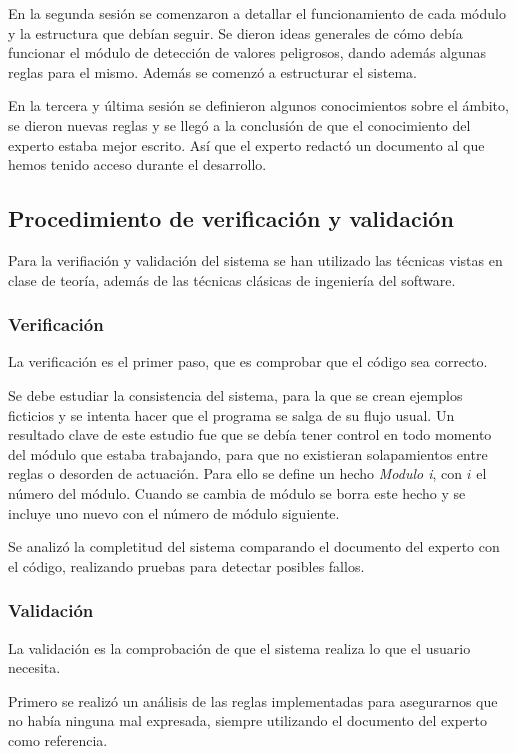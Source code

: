 \documentclass[a4paper, 11pt, titlepage]{article}
\theoremstyle{definition}
\begin{document}
  En la segunda sesión se comenzaron a detallar el funcionamiento de cada módulo
  y la estructura que debían seguir. Se dieron ideas generales de cómo debía
  funcionar el módulo de detección de valores peligrosos, dando además algunas
  reglas para el mismo. Además se comenzó a estructurar el sistema.

  En la tercera y última sesión se definieron algunos conocimientos sobre el
  ámbito, se dieron nuevas reglas y se llegó a la conclusión de que el conocimiento
  del experto estaba mejor escrito. Así que el experto redactó un documento
  al que hemos tenido acceso durante el desarrollo.

  \subsection{Procedimiento de verificación y validación}
  Para la verifiación y validación del sistema se han utilizado las técnicas vistas
  en clase de teoría, además de las técnicas clásicas de ingeniería del software.

  \subsubsection*{Verificación}
  La verificación es el primer paso, que es comprobar que el código sea correcto.

  Se debe estudiar la consistencia del sistema, para la que se crean ejemplos
  ficticios y se intenta hacer que el programa se salga de su flujo usual. Un
  resultado clave de este estudio fue que se debía tener control en todo momento
  del módulo que estaba trabajando, para que no existieran solapamientos entre
  reglas o desorden de actuación. Para ello se define un hecho \emph{Modulo i},
  con $i$ el número del módulo. Cuando se cambia de módulo se borra este hecho
  y se incluye uno nuevo con el número de módulo siguiente.

  Se analizó la completitud del sistema comparando el documento del experto
  con el código, realizando pruebas para detectar posibles fallos.

  \subsubsection*{Validación}
  La validación es la comprobación de que el sistema realiza lo que el usuario
  necesita.

  Primero se realizó un análisis de las reglas implementadas para asegurarnos
  que no había ninguna mal expresada, siempre utilizando el documento del experto
  como referencia.
\end{document}
